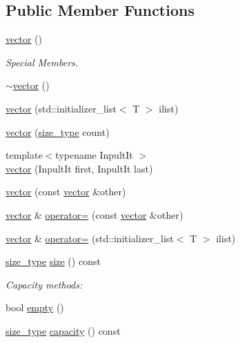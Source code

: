 \subsection*{Public Member Functions}
\begin{DoxyCompactItemize}
\item 
\hyperlink{classsc_1_1vector_a8ceb2f122374a0fe1c645ebe5e759279}{vector} ()
\begin{DoxyCompactList}\small\item\em Special Members. \end{DoxyCompactList}\item 
\hyperlink{classsc_1_1vector_a024d736c8ec23f0bc187a4a0e59b2da5}{$\sim$vector} ()
\item 
\hyperlink{classsc_1_1vector_a431bb1411ec9a488b68b0eed9d8b5727}{vector} (std\+::initializer\+\_\+list$<$ T $>$ ilist)
\item 
\hyperlink{classsc_1_1vector_a641fcc38459aee8e3bdf86abb5f9d193}{vector} (\hyperlink{classsc_1_1vector_a48bf37ba1a6d0c13504414d86e27c399}{size\+\_\+type} count)
\item 
{\footnotesize template$<$typename Inpult\+It $>$ }\\\hyperlink{classsc_1_1vector_ae8d5902ac778d0ec063f76dce01cd150}{vector} (Inpult\+It first, Inpult\+It last)
\item 
\hyperlink{classsc_1_1vector_aed6fb1e650e0256b483ce754a473c4c2}{vector} (const \hyperlink{classsc_1_1vector}{vector} \&other)
\item 
\hyperlink{classsc_1_1vector}{vector} \& \hyperlink{classsc_1_1vector_ac645bc2fa1244d211c9ceecb68d4d539}{operator=} (const \hyperlink{classsc_1_1vector}{vector} \&other)
\item 
\hyperlink{classsc_1_1vector}{vector} \& \hyperlink{classsc_1_1vector_a757984cf36675541db735350d227d609}{operator=} (std\+::initializer\+\_\+list$<$ T $>$ ilist)
\item 
\hyperlink{classsc_1_1vector_a48bf37ba1a6d0c13504414d86e27c399}{size\+\_\+type} \hyperlink{classsc_1_1vector_a1a2113e8d3d4c1494a929d55237d6dde}{size} () const
\begin{DoxyCompactList}\small\item\em Capacity methods\+: \end{DoxyCompactList}\item 
bool \hyperlink{classsc_1_1vector_a74d59d93240b308c7b4409af489bc3c5}{empty} ()
\item 
\hyperlink{classsc_1_1vector_a48bf37ba1a6d0c13504414d86e27c399}{size\+\_\+type} \hyperlink{classsc_1_1vector_a318c4ab34bd9605214e99db94c4258a9}{capacity} () const

\end{DoxyCompactItemize}
